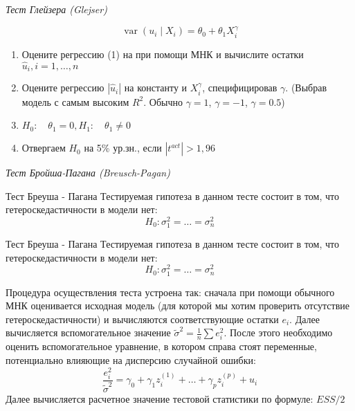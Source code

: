 \documentclass[a4paper,8pt]{article} %
\begin{document}


\textit{Тест Глейзера  (Glejser)}

$$
\operatorname{var}\left(u_{i} \mid X_{i}\right)=\theta_{0}+\theta_{1} X_{i}^{\gamma}
$$
\begin{enumerate}
	\item Оцените регрессию (1) на при помощи МНК и вычислите остатки $\hat{u}_{i}, i=1, \ldots, n$
	\item Оцените регрессию $\left|\hat{u}_{i}\right|$ на константу и $X_{i}^{\gamma}$, специфицировав $\gamma .$ (Выбрав модель с самым высоким  $R^2$. Обычно $\gamma=1$, $\gamma=-1$, $\gamma=0.5$)
	\item  $H_{0}: \quad \theta_{1}=0, H_{1}: \quad \theta_{1} \neq 0$
	\item  Отвергаем $H_{0}$ на 5\% ур.зн., если $\left|t^{a c t}\right|>1,96$
\end{enumerate}



\textit{Тест Бройша-Пагана  (Breusch-Pagan)}

Тест Бреуша - Пагана Тестируемая гипотеза в данном тесте состоит в том, что гетероскедастичности в модели нет:
$$
H_{0}: \sigma_{1}^{2}=\ldots=\sigma_{n}^{2}
$$

Тест Бреуша - Пагана Тестируемая гипотеза в данном тесте состоит в том, что гетероскедастичности в модели нет:
$$
H_{0}: \sigma_{1}^{2}=\ldots=\sigma_{n}^{2}
$$

Процедура осуществления теста устроена так: сначала при помощи обычного МНК оценивается исходная модель (для которой мы хотим проверить отсутствие гетероскедастичности) и вычисляются соответствующие остатки $e_{i} .$ Далее вычисляется вспомогательное значение $\tilde{\sigma}^{2}=\frac{1}{n} \sum e_{i}^{2} .$ После этого необходимо оценить вспомогательное уравнение, в котором справа стоят переменные, потенциально влияющие на дисперсию случайной ошибки:
$$
\frac{e_{i}^{2}}{\tilde{\sigma}^{2}}=\gamma_{0}+\gamma_{1} z_{i}^{(1)}+\ldots+\gamma_{p} z_{i}^{(p)}+u_{i}
$$
Далее вычисляется расчетное значение тестовой статистики по формуле:
$ESS/2$
\end{document}

